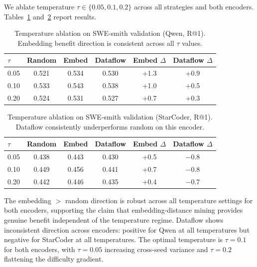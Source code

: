 \documentclass[11pt,a4paper]{article}
\begin{document}
We ablate temperature $\tau \in \{0.05, 0.1, 0.2\}$ across all strategies and both encoders. Tables~\ref{tab:temp_qwen} and~\ref{tab:temp_starcoder} report results.

\begin{table}[t]
\centering
\small
\begin{tabular}{lccccc}
\toprule
$\tau$ & \textbf{Random} & \textbf{Embed} & \textbf{Dataflow} & \textbf{Embed $\Delta$} & \textbf{Dataflow $\Delta$} \\
\midrule
0.05 & 0.521 & 0.534 & 0.530 & +1.3 & +0.9 \\
0.10 & 0.533 & 0.543 & 0.538 & +1.0 & +0.5 \\
0.20 & 0.524 & 0.531 & 0.527 & +0.7 & +0.3 \\
\bottomrule
\end{tabular}
\caption{Temperature ablation on SWE-smith validation (Qwen, R@1). Embedding benefit direction is consistent across all $\tau$ values.}
\label{tab:temp_qwen}
\end{table}

\begin{table}[t]
\centering
\small
\begin{tabular}{lccccc}
\toprule
$\tau$ & \textbf{Random} & \textbf{Embed} & \textbf{Dataflow} & \textbf{Embed $\Delta$} & \textbf{Dataflow $\Delta$} \\
\midrule
0.05 & 0.438 & 0.443 & 0.430 & +0.5 & $-$0.8 \\
0.10 & 0.449 & 0.456 & 0.441 & +0.7 & $-$0.8 \\
0.20 & 0.442 & 0.446 & 0.435 & +0.4 & $-$0.7 \\
\bottomrule
\end{tabular}
\caption{Temperature ablation on SWE-smith validation (StarCoder, R@1). Dataflow consistently underperforms random on this encoder.}
\label{tab:temp_starcoder}
\end{table}

The embedding $>$ random direction is robust across all temperature settings for both encoders, supporting the claim that embedding-distance mining provides genuine benefit independent of the temperature regime. Dataflow shows inconsistent direction across encoders: positive for Qwen at all temperatures but negative for StarCoder at all temperatures. The optimal temperature is $\tau = 0.1$ for both encoders, with $\tau = 0.05$ increasing cross-seed variance and $\tau = 0.2$ flattening the difficulty gradient.

\end{document}
